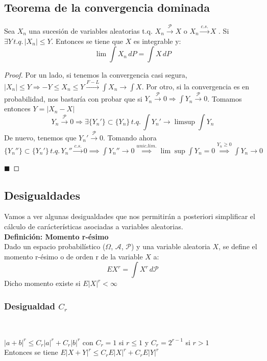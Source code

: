 \documentclass[12pt,a4paper]{book}
\newcommand*{\qed}{\hfill\ensuremath{\blacksquare}}
\begin{document}
\subsection{Teorema de la convergencia dominada}
\begin{theorem}
Sea $X_n$ una sucesión de variables aleatorias t.q.  $X_n \stackrel{\mathcal{P}}{\rightarrow} X$ o $X_n \stackrel{c.s.}{\rightarrow} X$  . Si $\exists Y \, t.q. \, |X_n |\leq Y$. Entonces se tiene que $X$ es integrable y:
$$\lim\int X_n\, dP=\int X\, dP$$
\end{theorem}

\begin{proof}
Por un lado, si tenemos la convergencia casi segura, $|X_n| \leq Y \Rightarrow -Y \leq X_n \leq Y \stackrel{F-L}{\rightarrow} \displaystyle \int X_n \to \int X$.
Por otro, si la convergencia es en probabilidad, nos bastaría con probar que si $Y_n \stackrel{\mathcal{P}}{\rightarrow} 0 \Rightarrow \displaystyle \int Y_n \stackrel{\mathcal{P}}{\rightarrow} 0$. Tomamos entonces $Y = |X_n - X|$
$$ Y_n \stackrel{\mathcal{P}}{\rightarrow} 0 \Rightarrow \exists \{Y_n'\} \subset \{Y_n\} \, t.q. \, \int Y_n' \rightarrow \limsup \int Y_n$$
De nuevo, tenemos que $Y_n' \stackrel{\mathcal{P}}{\rightarrow} 0$. Tomando ahora $\{Y_n''\} \subset \{Y_n'\} \, t.q. \, Y_n'' \stackrel{c.s.}{\rightarrow} 0 
\implies 
\displaystyle \int Y_n'' \rightarrow 0 \stackrel{unic.lim.}{\implies} \lim \sup \int Y_n = 0 \stackrel{Y_n \geq 0}{\implies} \int Y_n \rightarrow 0$

\qed
\end{proof}

\subsection{Desigualdades}

Vamos a ver algunas desigualdades que nos permitirán a posteriori simplificar el cálculo de carácterísticas asociadas a variables aleatorias.\\

\textbf{Definición: Momento r-ésimo}\\

Dado un espacio probabilístico ($\Omega$, $\mathcal{A}$, $\mathcal{P}$) y una variable aleatoria $X$, se define el momento r-ésimo o de orden r de la variable $X$ a:
$$ EX^r = \int X^r \, d \mathcal{P} $$
Dicho momento existe si $E|X|^r < \infty$

\subsubsection{Desigualdad $C_r$}
\begin{lemma}

\
	
$|a+b|^r\leq C_r |a|^r + C_r |b|^r$ con $C_r=1$ si $r\leq1$ y $C_r=2^{r-1}$ si $r>1$\\

Entonces se tiene $E|X+Y|^r \leq C_r E|X|^r + C_r E|Y|^r$
\end{lemma}
\end{document}
